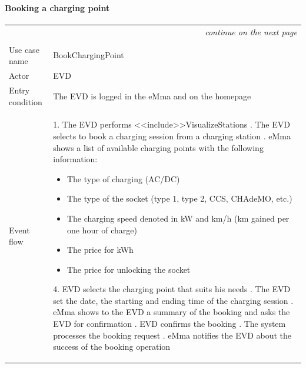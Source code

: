 \paragraph{Booking a charging point}
\begin{center}
    \begin{longtable}{p{4cm} p{11cm}}
    \multicolumn{2}{r}{\itshape{continue on the next page}}\\
    \endfoot 
    \\
    \endlastfoot
    \hline
     Use case name &  BookChargingPoint\\
     \hline
     Actor & EVD \\
     \hline
     Entry condition &   The EVD is logged in the eMma and on the homepage\\
     \hline
     Event flow &
        1. The EVD performs <<include>>VisualizeStations \newline
        2. The EVD selects to book a charging session from a charging station \newline
        3. eMma shows a list of available charging points with the following information:
            \begin{adjustwidth}{0.5cm}{}
                \begin{itemize}
                    \item The type of charging (AC/DC)
                    \item The type of the socket (type 1, type 2, CCS, CHAdeMO, etc.)
                    \item The charging speed denoted in kW and km/h (km gained per one hour of charge)
                    \item The price for kWh
                    \item The price for unlocking the socket
                \end{itemize}
            \end{adjustwidth}
        4. EVD selects the charging point that suits his needs \newline
        5. The EVD set the date, the starting and ending time of the charging session \newline
        6. eMma shows to the EVD a summary of the booking and asks the EVD for confirmation \newline
        7. EVD confirms the booking \newline
        8. The system processes the booking request \newline
        9. eMma notifies the EVD about the success of the booking operation\\

\end{longtable}
\end{center}
